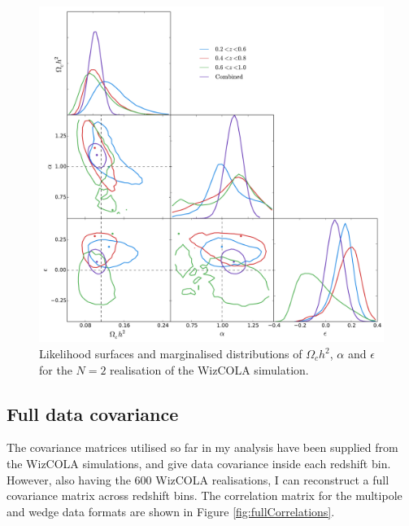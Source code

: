 \documentclass[titlesmallcaps, examinerscopy, copyrightpage]{uqthesis}
\begin{document}
\begin{figure}[h!]
  \begin{center}
    \includegraphics[width=\textwidth]{images/corCombined_2.pdf}
  \end{center}
  \caption{Likelihood surfaces and marginalised distributions of $\Omega_ch^2$, $\alpha$ and $\epsilon$ for the $N=2$ realisation of the WizCOLA simulation. }
  \label{fig:corCombined_2}
\end{figure}





\subsection{Full data covariance}

The covariance matrices utilised so far in my analysis have been supplied from the WizCOLA simulations, and give data covariance inside each redshift bin. However, also having the 600 WizCOLA realisations, I can reconstruct a full covariance matrix across redshift bins. The correlation matrix for the multipole and wedge data formats are shown in Figure \ref{fig:fullCorrelations}.
\end{document}
